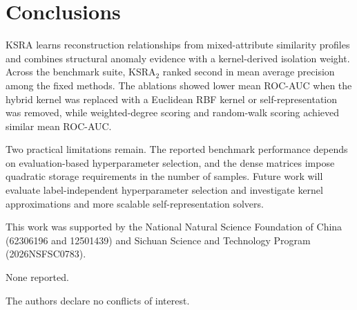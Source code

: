 \documentclass[ASNA,twocolumn]{USG} %
\begin{document}
\section{Conclusions}\label{Conclusions}

KSRA learns reconstruction relationships from mixed-attribute similarity profiles and combines structural anomaly evidence with a kernel-derived isolation weight. Across the benchmark suite, KSRA$_2$ ranked second in mean average precision among the fixed methods. The ablations showed lower mean ROC-AUC when the hybrid kernel was replaced with a Euclidean RBF kernel or self-representation was removed, while weighted-degree scoring and random-walk scoring achieved similar mean ROC-AUC.

Two practical limitations remain. The reported benchmark performance depends on evaluation-based hyperparameter selection, and the dense matrices impose quadratic storage requirements in the number of samples. Future work will evaluate label-independent hyperparameter selection and investigate kernel approximations and more scalable self-representation solvers.



This work was supported by the National Natural Science Foundation of China (62306196 and 12501439) and Sichuan Science and Technology Program (2026NSFSC0783).


None reported.


The authors declare no conflicts of interest.


\end{document}
